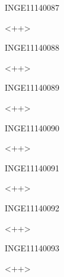 \documentclass{article}
\begin{document}
\begin{corrige}{INGE11140087}

<++>

\end{corrige}%


\begin{corrige}{INGE11140088}

<++>

\end{corrige}%


\begin{corrige}{INGE11140089}

<++>

\end{corrige}%


\begin{corrige}{INGE11140090}

<++>

\end{corrige}%


\begin{corrige}{INGE11140091}

<++>

\end{corrige}%


\begin{corrige}{INGE11140092}

<++>

\end{corrige}%


\begin{corrige}{INGE11140093}

<++>

\end{corrige}%
\end{document}
